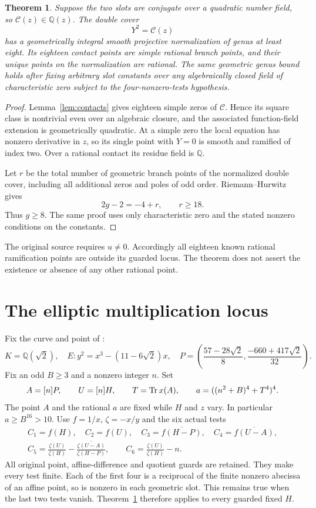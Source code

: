 \documentclass[11pt,a4paper]{article}
\newtheorem{theorem}{Theorem}[section]
\newcommand{\Q}{\mathbb Q}\newcommand{\Z}{\mathbb Z}
\begin{document}
\begin{theorem}\label{thm:genus}
Suppose the two slots are conjugate over a quadratic number field,
so $\mathcal C(z)\in\Q(z)$. The double cover
\[
                              Y^2=\mathcal C(z)
\]
has a geometrically integral smooth projective normalization of
genus at least eight. Its eighteen contact points are simple rational
branch points, and their unique points on the normalization are
rational. The same geometric genus bound holds after fixing arbitrary
slot constants over any algebraically closed field of characteristic
zero subject to the four-nonzero-tests hypothesis.
\end{theorem}
\begin{proof}
Lemma~\ref{lem:contacts} gives eighteen simple zeros of
$\mathcal C$. Hence its square class is nontrivial even over an
algebraic closure, and the associated function-field extension is
geometrically quadratic. At a simple zero the local equation has
nonzero derivative in $z$, so its single point with $Y=0$ is smooth
and ramified of index two. Over a rational contact its residue field
is $\Q$.

Let $r$ be the total number of geometric branch points of the
normalized double cover, including all additional zeros and poles
of odd order. Riemann--Hurwitz gives
\[
                         2g-2=-4+r,\qquad r\ge18.
\]
Thus $g\ge8$. The same proof uses only characteristic zero and the
stated nonzero conditions on the constants.
\end{proof}

The original source requires $u\ne0$. Accordingly all eighteen
known rational ramification points are outside its guarded locus.
The theorem does not assert the existence or absence of any other
rational point.

\section{The elliptic multiplication locus}

Fix the curve and point of \cite{Derivative,Criterion}:
\[
 K=\Q(\sqrt2),\quad E:y^2=x^3-(11-6\sqrt2)x,\quad
 P=\left(\frac{57-28\sqrt2}{8},\frac{-660+417\sqrt2}{32}\right).
\]
Fix an odd $B\ge3$ and a nonzero integer $n$. Set
\[
 A=[n]P,\qquad U=[n]H,\qquad
 T=\operatorname{Tr} x(A),\qquad a=((n^2+B)^4+T^4)^4.
\]
The point $A$ and the rational $a$ are fixed while $H$ and $z$ vary.
In particular $a\ge B^{16}>10$.
Use $f=1/x$, $\zeta=-x/y$ and the six actual tests
\[
 \begin{gathered}
 C_1=f(H),\quad C_2=f(U),\quad
 C_3=\overline{f(H-P)},\quad C_4=\overline{f(U-A)},\\
 C_5=\frac{\zeta(U)}{\zeta(H)}-
          \overline{\frac{\zeta(U-A)}{\zeta(H-P)}},\qquad
 C_6=\frac{\zeta(U)}{\zeta(H)}-n.
 \end{gathered}
\]
All original point, affine-difference and quotient guards are retained.
They make every test finite. Each of the first four is a reciprocal
of the finite nonzero abscissa of an affine point, so is nonzero in
each geometric slot. This remains true when the last two tests vanish.
Theorem~\ref{thm:genus} therefore applies to every guarded fixed $H$.
\end{document}
